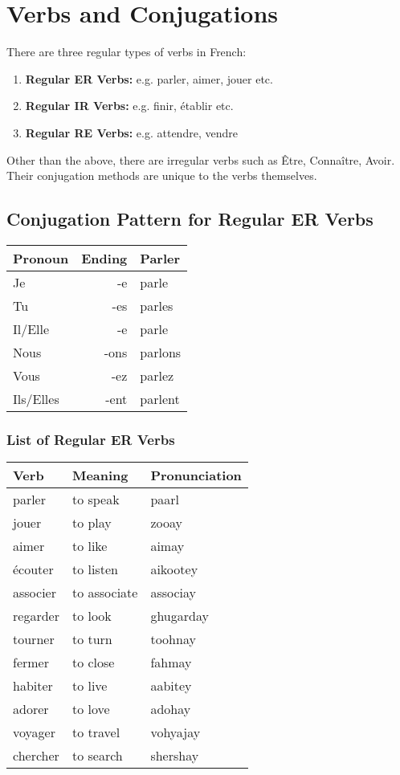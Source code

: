 \section{Verbs and Conjugations}

There are three regular types of verbs in French:
\begin{enumerate}
\item{\textbf{Regular ER Verbs:} e.g. parler, aimer, jouer etc.}
\item{\textbf{Regular IR Verbs:} e.g. finir, \'etablir etc.}
\item{\textbf{Regular RE Verbs:} e.g. attendre, vendre}
\end{enumerate}
Other than the above, there are irregular verbs such as \^Etre, Conna\^itre, Avoir.
Their conjugation methods are unique to the verbs themselves. 

\subsection{Conjugation Pattern for Regular ER Verbs}

\begin{tabular}{| l | r | l |}
\hline
Pronoun 	& 	Ending 	& 	Parler	\\ 	\hline
Je		&	-e	& 	parle	\\ 	\hline
Tu		&	-es	&	parles	\\	\hline
Il/Elle		&	-e	&	parle	\\	\hline
Nous		&	-ons	&	parlons	\\	\hline
Vous		&	-ez	&	parlez	\\	\hline
Ils/Elles	&	-ent	&	parlent	\\	\hline
\end{tabular}

\subsubsection{List of Regular ER Verbs}

\begin{longtable}{| l | l | l |}
\hline
Verb 		& Meaning 		& Pronunciation	\\
\hline
\endhead
parler		& to speak		& paarl			\\ 	\hline
jouer		& to play		& zooay			\\	\hline
aimer		& to like		& aimay			\\	\hline
\'ecouter	& to listen		& aikootey		\\	\hline
associer	& to associate		& associay		\\	\hline
regarder	& to look		& ghugarday		\\	\hline
tourner		& to turn		& toohnay		\\	\hline
fermer		& to close		& fahmay		\\	\hline
habiter		& to live		& aabitey		\\	\hline
adorer 		& to love		& adohay		\\	\hline
voyager 	& to travel		& vohyajay		\\	\hline
chercher	& to search		& shershay		\\	\hline
\end{longtable}

